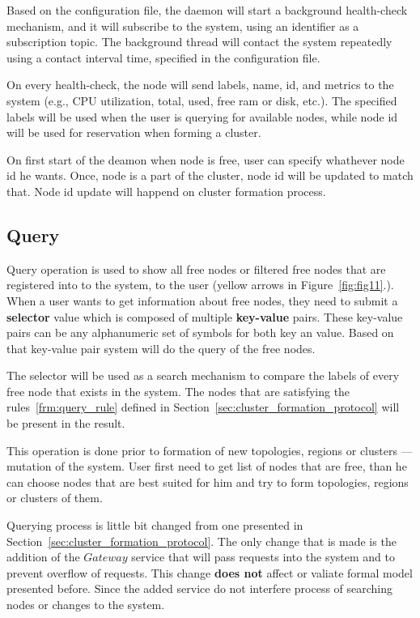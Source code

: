 Based on the configuration file, the daemon will start a background health-check mechanism, and it will subscribe to the system, using an identifier as a subscription topic. The background thread will contact the system repeatedly using a contact interval time, specified in the configuration file. 

On every health-check, the node will send labels, name, id, and metrics to the system (e.g., CPU utilization, total, used, free ram or disk, etc.). The specified labels will be used when the user is querying for available nodes, while node id will be used for reservation when forming a cluster.

On first start of the deamon when node is free, user can specify whathever node id he wants. Once, node is a part of the cluster, node id will be updated to match that. Node id update will happend on cluster formation process.
%
\subsection{Query}\label{sec:query} 
% 
Query operation is used to show all free nodes or filtered free nodes that are registered into to the system, to the user (yellow arrows in Figure~\ref{fig:fig11}.). When a user wants to get information about free nodes, they need to submit a \textbf{selector} value which is composed of multiple \textbf{key-value} pairs.  These key-value pairs can be any alphanumeric set of symbols for both key an value. Based on that key-value pair system will do the query of the free nodes.

The selector will be used as a search mechanism to compare the labels of every free node that exists in the system. The nodes that are satisfying the rules~\ref{frm:query_rule} defined in Section~\ref{sec:cluster_formation_protocol} will be present in the result.

This operation is done prior to formation of new topologies, regions or clusters --- mutation of the system. User first need to get list of nodes that are free, than he can choose nodes that are best suited for him and try to form topologies, regions or clusters of them.

Querying process is little bit changed from one presented in Section~\ref{sec:cluster_formation_protocol}. The only change that is made is the addition of the $Gateway$ service that will pass requests into the system and to prevent overflow of requests. This change \textbf{does not} affect or valiate formal model presented before. Since the added service do not interfere process of searching nodes or changes to the system.

